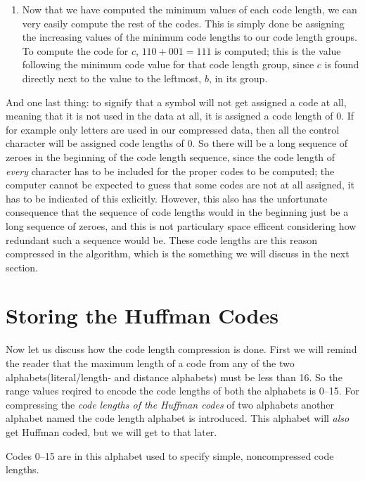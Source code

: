 \begin{enumerate}
  \item Now that we have computed the minimum values of each code
    length, we can very easily compute the rest of the codes. This is
    simply done be assigning the increasing values of the minimum code
    lengths to our code length groups. To compute the code for $c$,
    $110 + 001 = 111$ is computed; this is the value following the
    minimum code value for that code length group, since $c$ is found
    directly next to the value to the leftmost, $b$, in its group.

\end{enumerate}

And one last thing: to signify that a symbol will not get assigned a
code at all, meaning that it is not used in the data at all, it is
assigned a code length of $0$. If for example only \ascii letters are
used in our compressed data, then all the control character will be
assigned code lengths of $0$. So there will be a long sequence of
zeroes in the beginning of the code length sequence, since the code
length of \textit{every} character has to be included for the proper
codes to be computed; the computer cannot be expected to guess that
some codes are not at all assigned, it has to be indicated of this
exlicitly. However, this also has the unfortunate consequence that the
sequence of code lengths would in the beginning just be a long
sequence of zeroes, and this is not particulary space efficent
considering how redundant such a sequence would be. These code lengths
are this reason compressed in the  algorithm, which is the
something we will discuss in the next section.

\section{Storing the Huffman Codes}
\label{sec:storing-huffman-codes}

Now let us discuss how the code length compression is done. First we
will remind the reader that the maximum length of a code from any of
the two alphabets(literal/length- and distance alphabets) must be
less than 16. So the range values reqired to encode the code lengths
of both the alphabets is 0--15. For compressing the \textit{code
  lengths of the Huffman codes} of two alphabets another alphabet
named the code length alphabet is introduced. This alphabet will
\textit{also} get Huffman coded, but we will get to that later.

Codes 0--15 are in this alphabet used to specify simple,
noncompressed code lengths.

